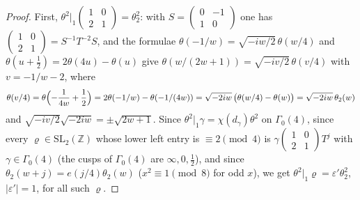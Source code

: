 ﻿\documentclass[11pt]{amsart}
\theoremstyle{remark}
\newcommand{\Z}{\mathbb{Z}}
\newcommand{\e}{\varepsilon}
\begin{document}
\begin{proof}
First, $\theta^2|_1\left(\begin{smallmatrix}1&0\\2&1\end{smallmatrix}\right)=\theta_2^2$: with $S=\left(\begin{smallmatrix}0&-1\\1&0\end{smallmatrix}\right)$ one has $\left(\begin{smallmatrix}1&0\\2&1\end{smallmatrix}\right)=S^{-1}T^{-2}S$, and the formulae $\theta(-1/w)=\sqrt{-iw/2}\,\theta(w/4)$ and $\theta(u+\frac12)=2\theta(4u)-\theta(u)$ give $\theta(w/(2w+1))=\sqrt{-iv/2}\,\theta(v/4)$ with $v=-1/w-2$, where
\[
\theta(v/4)=\theta\Bigl(-\frac1{4w}+\frac12\Bigr)=2\theta(-1/w)-\theta(-1/(4w))=\sqrt{-2iw}\,\bigl(\theta(w/4)-\theta(w)\bigr)=\sqrt{-2iw}\,\theta_2(w)
\]
and $\sqrt{-iv/2}\sqrt{-2iw}=\pm\sqrt{2w+1}$. Since $\theta^2|_1\gamma=\chi(d_\gamma)\theta^2$ on $\Gamma_0(4)$, since every $\varrho\in\mathrm{SL}_2(\Z)$ whose lower left entry is $\equiv2\pmod 4$ is $\gamma\left(\begin{smallmatrix}1&0\\2&1\end{smallmatrix}\right)T^j$ with $\gamma\in\Gamma_0(4)$ (the cusps of $\Gamma_0(4)$ are $\infty,0,\frac12$), and since $\theta_2(w+j)=e(j/4)\theta_2(w)$ ($x^2\equiv1\pmod 8$ for odd $x$), we get $\theta^2|_1\varrho=\e'\theta_2^2$, $|\e'|=1$, for all such $\varrho$.


\end{proof}
\end{document}
